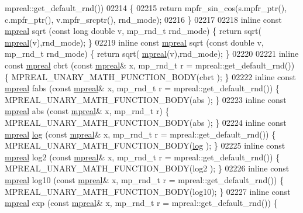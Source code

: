 \begin{DoxyCode}
{{      mpreal::get\_default\_rnd())
02214 \{
02215     \textcolor{keywordflow}{return} mpfr\_sin\_cos(s.mpfr\_ptr(), c.mpfr\_ptr(), v.mpfr\_srcptr(), rnd\_mode);
02216 \}
02217 
02218 \textcolor{keyword}{inline} \textcolor{keyword}{const} \hyperlink{classmpfr_1_1mpreal}{mpreal} sqrt  (\textcolor{keyword}{const} \textcolor{keywordtype}{long} \textcolor{keywordtype}{double} v, mp\_rnd\_t rnd\_mode)    \{   \textcolor{keywordflow}{return} sqrt(
      \hyperlink{classmpfr_1_1mpreal}{mpreal}(v),rnd\_mode);    \}
02219 \textcolor{keyword}{inline} \textcolor{keyword}{const} \hyperlink{classmpfr_1_1mpreal}{mpreal} sqrt  (\textcolor{keyword}{const} \textcolor{keywordtype}{double} v, mp\_rnd\_t rnd\_mode)         \{   \textcolor{keywordflow}{return} sqrt(
      \hyperlink{classmpfr_1_1mpreal}{mpreal}(v),rnd\_mode);    \}
02220 
02221 \textcolor{keyword}{inline} \textcolor{keyword}{const} \hyperlink{classmpfr_1_1mpreal}{mpreal} cbrt  (\textcolor{keyword}{const} \hyperlink{classmpfr_1_1mpreal}{mpreal}& x, mp\_rnd\_t r = mpreal::get\_default\_rnd()) \{   
      MPREAL\_UNARY\_MATH\_FUNCTION\_BODY(cbrt );    \}
02222 \textcolor{keyword}{inline} \textcolor{keyword}{const} \hyperlink{classmpfr_1_1mpreal}{mpreal} fabs  (\textcolor{keyword}{const} \hyperlink{classmpfr_1_1mpreal}{mpreal}& x, mp\_rnd\_t r = mpreal::get\_default\_rnd()) \{   
      MPREAL\_UNARY\_MATH\_FUNCTION\_BODY(abs  );    \}
02223 \textcolor{keyword}{inline} \textcolor{keyword}{const} \hyperlink{classmpfr_1_1mpreal}{mpreal} abs   (\textcolor{keyword}{const} \hyperlink{classmpfr_1_1mpreal}{mpreal}& x, mp\_rnd\_t r)                             \{   
      MPREAL\_UNARY\_MATH\_FUNCTION\_BODY(abs  );    \}
02224 \textcolor{keyword}{inline} \textcolor{keyword}{const} \hyperlink{classmpfr_1_1mpreal}{mpreal} \hyperlink{structlog}{log}   (\textcolor{keyword}{const} \hyperlink{classmpfr_1_1mpreal}{mpreal}& x, mp\_rnd\_t r = mpreal::get\_default\_rnd()) \{   
      MPREAL\_UNARY\_MATH\_FUNCTION\_BODY(\hyperlink{structlog}{log}  );    \}
02225 \textcolor{keyword}{inline} \textcolor{keyword}{const} \hyperlink{classmpfr_1_1mpreal}{mpreal} log2  (\textcolor{keyword}{const} \hyperlink{classmpfr_1_1mpreal}{mpreal}& x, mp\_rnd\_t r = mpreal::get\_default\_rnd()) \{   
      MPREAL\_UNARY\_MATH\_FUNCTION\_BODY(log2 );    \}
02226 \textcolor{keyword}{inline} \textcolor{keyword}{const} \hyperlink{classmpfr_1_1mpreal}{mpreal} log10 (\textcolor{keyword}{const} \hyperlink{classmpfr_1_1mpreal}{mpreal}& x, mp\_rnd\_t r = mpreal::get\_default\_rnd()) \{   
      MPREAL\_UNARY\_MATH\_FUNCTION\_BODY(log10);    \}
02227 \textcolor{keyword}{inline} \textcolor{keyword}{const} \hyperlink{classmpfr_1_1mpreal}{mpreal} exp   (\textcolor{keyword}{const} \hyperlink{classmpfr_1_1mpreal}{mpreal}& x, mp\_rnd\_t r = mpreal::get\_default\_rnd()) \{   
}}
\end{DoxyCode}
